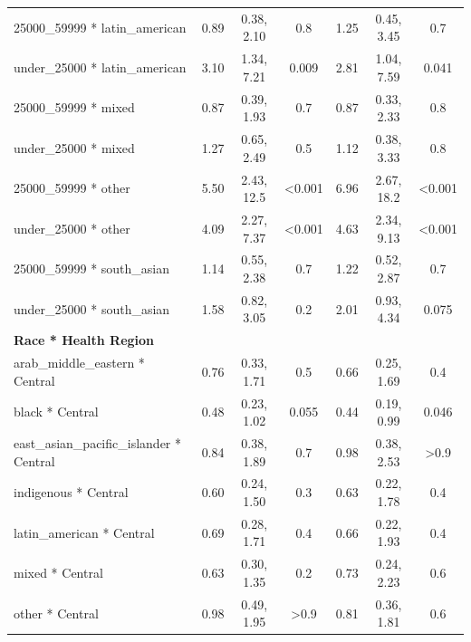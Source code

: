 \documentclass[
  letterpaper,
  DIV=11,
  numbers=noendperiod]{scrartcl}
\begin{document}
\begin{longtable}{lcccccc}
\hspace{1em}25000\_59999 * latin\_american & 0.89 & 0.38, 2.10 & 0.8 & 1.25 & 0.45, 3.45 & 0.7\\
\hspace{1em}under\_25000 * latin\_american & 3.10 & 1.34, 7.21 & 0.009 & 2.81 & 1.04, 7.59 & 0.041\\
\hspace{1em}25000\_59999 * mixed & 0.87 & 0.39, 1.93 & 0.7 & 0.87 & 0.33, 2.33 & 0.8\\
\hspace{1em}under\_25000 * mixed & 1.27 & 0.65, 2.49 & 0.5 & 1.12 & 0.38, 3.33 & 0.8\\
\hspace{1em}25000\_59999 * other & 5.50 & 2.43, 12.5 & <0.001 & 6.96 & 2.67, 18.2 & <0.001\\
\hspace{1em}under\_25000 * other & 4.09 & 2.27, 7.37 & <0.001 & 4.63 & 2.34, 9.13 & <0.001\\
\hspace{1em}25000\_59999 * south\_asian & 1.14 & 0.55, 2.38 & 0.7 & 1.22 & 0.52, 2.87 & 0.7\\
\hspace{1em}under\_25000 * south\_asian & 1.58 & 0.82, 3.05 & 0.2 & 2.01 & 0.93, 4.34 & 0.075\\
\textbf{Race * Health Region} &  &  &  &  &  & \\
\hspace{1em}arab\_middle\_eastern * Central & 0.76 & 0.33, 1.71 & 0.5 & 0.66 & 0.25, 1.69 & 0.4\\
\hspace{1em}black * Central & 0.48 & 0.23, 1.02 & 0.055 & 0.44 & 0.19, 0.99 & 0.046\\
\hspace{1em}east\_asian\_pacific\_islander * Central & 0.84 & 0.38, 1.89 & 0.7 & 0.98 & 0.38, 2.53 & >0.9\\
\hspace{1em}indigenous * Central & 0.60 & 0.24, 1.50 & 0.3 & 0.63 & 0.22, 1.78 & 0.4\\
\hspace{1em}latin\_american * Central & 0.69 & 0.28, 1.71 & 0.4 & 0.66 & 0.22, 1.93 & 0.4\\
\hspace{1em}mixed * Central & 0.63 & 0.30, 1.35 & 0.2 & 0.73 & 0.24, 2.23 & 0.6\\
\hspace{1em}other * Central & 0.98 & 0.49, 1.95 & >0.9 & 0.81 & 0.36, 1.81 & 0.6\\

\end{longtable}
\end{document}
